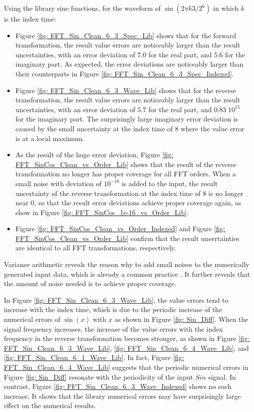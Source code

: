 \documentclass[twoside]{article}
\numberwithin{equation}{section}
\begin{document}
Using the library sine functions, for the waveform of $\sin(2\pi k 3/2^6)$ in which $k$ is the index time:
\begin{itemize}
\item Figure \ref{fig: FFT_Sin_Clean_6_3_Spec_Lib} shows that for the forward transformation, the result value errors are noticeably larger than the result uncertainties, with an error deviation of $7.0$ for the real part, and $5.6$ for the imaginary part.
As expected, the error deviations are noticeably larger than their counterparts in Figure \ref{fig: FFT_Sin_Clean_6_3_Spec_Indexed}.

\item Figure \ref{fig: FFT_Sin_Clean_6_3_Wave_Lib} shows that for the reverse transformation, the result value errors are noticeably larger than the result uncertainties, with an error deviation of $5.7$ for the real part, and $	0.83 \; 10^{15}$ for the imaginary part. 
The surprisingly large imaginary error deviation is caused by the small uncertainty at the index time of $8$ where the value error is at a local maximum.

\item As the result of the huge error deviation, Figure \ref{fig: FFT_SinCos_Clean_vs_Order_Lib} shows that the result of the reverse transformation no longer has proper coverage for all FFT orders.
When a small noise with deviation of $10^{-16}$ is added to the input, the result uncertainty of the reverse transformation at the index time of $8$ is no longer near $0$, so that the result error deviations achieve proper coverage again, as show in Figure \ref{fig: FFT_SinCos_1e-16_vs_Order_Lib}.

\item Figure \ref{fig: FFT_SinCos_Clean_vs_Order_Indexed} and Figure \ref{fig: FFT_SinCos_Clean_vs_Order_Lib} confirm that the result uncertainties are identical to all FFT transformations, respectively.
\end{itemize}
Variance arithmetic reveals the reason why to add small noises to the numerically generated input data, which is already a common practice \cite{Numerical_Recipes}.
It further reveals that the amount of noise needed is to achieve proper coverage.

In Figure \ref{fig: FFT_Sin_Clean_6_3_Wave_Lib}, the value errors tend to increase with the index time, which is due to the periodic increase of the numerical errors of $\sin(x)$ with $x$ as shown in Figure \ref{fig: Sin_Diff}.
When the signal frequency increases, the increase of the value errors with the index frequency in the reverse transformation becomes stronger, as shown in Figure \ref{fig: FFT_Sin_Clean_6_3_Wave_Lib}, \ref{fig: FFT_Sin_Clean_6_4_Wave_Lib}, and \ref{fig: FFT_Sin_Clean_6_1_Wave_Lib}.
In fact, Figure \ref{fig: FFT_Sin_Clean_6_4_Wave_Lib} suggests that the periodic numerical errors in  Figure \ref{fig: Sin_Diff} resonate with the periodicity of the input $Sin$ signal.
In contrast, Figure \ref{fig: FFT_Sin_Clean_6_3_Wave_Indexed} shows no such increase.
It shows that the library numerical errors may have surprisingly large effect on the numerical results.
\end{document}
